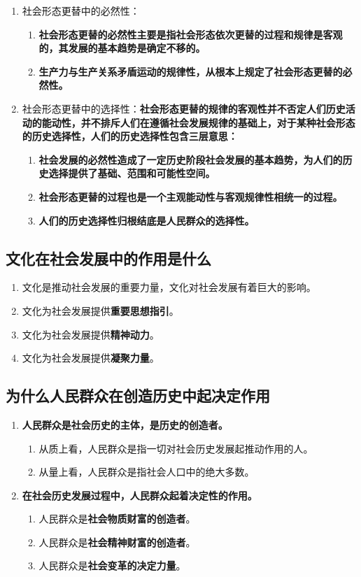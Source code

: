 \documentclass[12pt, a4paper, oneside]{ctexbook}
\begin{document}
\begin{enumerate}
\item 社会形态更替中的必然性：
\begin{enumerate}
\item \textbf{社会形态更替的必然性主要是指社会形态依次更替的过程和规律是客观的，其发展的基本趋势是确定不移的。}
\item \textbf{生产力与生产关系矛盾运动的规律性，从根本上规定了社会形态更替的必然性。}
\end{enumerate}
\item 社会形态更替中的选择性：\textbf{社会形态更替的规律的客观性并不否定人们历史活动的能动性，并不排斥人们在遵循社会发展规律的基础上，对于某种社会形态的历史选择性，人们的历史选择性包含三层意思：}
\begin{enumerate}
\item \textbf{社会发展的必然性造成了一定历史阶段社会发展的基本趋势，为人们的历史选择提供了基础、范围和可能性空间。}
\item \textbf{社会形态更替的过程也是一个主观能动性与客观规律性相统一的过程。}
\item \textbf{人们的历史选择性归根结底是人民群众的选择性。}
\end{enumerate}
\end{enumerate}

\subsection{文化在社会发展中的作用是什么}

\begin{enumerate}
\item 文化是推动社会发展的重要力量，文化对社会发展有着巨大的影响。
\item 文化为社会发展提供\textbf{重要思想指引}。
\item 文化为社会发展提供\textbf{精神动力}。
\item 文化为社会发展提供\textbf{凝聚力量}。
\end{enumerate}

\subsection{为什么人民群众在创造历史中起决定作用}

\begin{enumerate}
\item \textbf{人民群众是社会历史的主体，是历史的创造者。}
\begin{enumerate}
\item 从质上看，人民群众是指一切对社会历史发展起推动作用的人。
\item 从量上看，人民群众是指社会人口中的绝大多数。
\end{enumerate}
\item \textbf{在社会历史发展过程中，人民群众起着决定性的作用。}
\begin{enumerate}
\item 人民群众是\textbf{社会物质财富的创造者}。
\item 人民群众是\textbf{社会精神财富的创造者}。
\item 人民群众是\textbf{社会变革的决定力量}。
\end{enumerate}
\end{enumerate}
\end{document}
